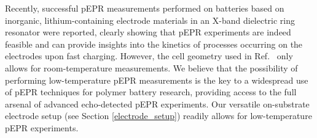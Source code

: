 \par
Recently, successful pEPR measurements performed on batteries based on inorganic, lithium-containing electrode materials in an X-band dielectric ring resonator were reported,\cite{szczuka2021_commmat} clearly showing that pEPR experiments are indeed feasible and can provide insights into the kinetics of processes occurring on the electrodes upon fast charging. However, the cell geometry used in Ref.~\cite{szczuka2021_commmat}  only allows for room-temperature measurements. We believe that the possibility of performing low-temperature pEPR measurements is the key to a widespread use of pEPR techniques for polymer battery research, providing access to the full arsenal of advanced echo-detected pEPR experiments. Our versatile on-substrate electrode setup (see Section \ref{electrode_setup}) readily allows for low-temperature pEPR experiments.


